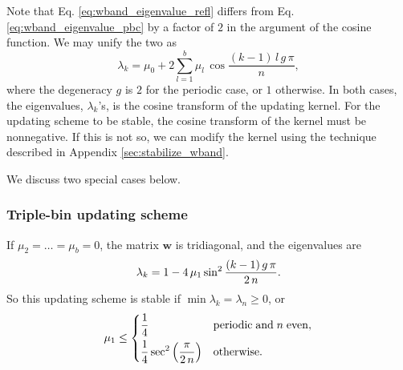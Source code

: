 \documentclass[reprint, floatfix]{revtex4-1}
\begin{document}
Note that Eq. \eqref{eq:wband_eigenvalue_refl}
differs from Eq. \eqref{eq:wband_eigenvalue_pbc}
by a factor of $2$
in the argument of the cosine function.
%
We may unify the two as
%
\begin{equation}
  \lambda_k
  =
  \mu_0
  +
  2
  \sum_{ l = 1 }^b
    \mu_l \,
    \cos \frac{ (k - 1) \, l \, g \, \pi }
              {            n             }
  ,
  \label{eq:wband_eigenvalue}
\end{equation}
%
where the degeneracy $g$ is $2$
for the periodic case,
or $1$ otherwise.
%
In both cases,
the eigenvalues, $\lambda_k$'s,
is the cosine transform of
the updating kernel.
%
For the updating scheme to be stable,
the cosine transform of the kernel
must be nonnegative.
%
If this is not so,
we can modify the kernel
using the technique described
in Appendix \ref{sec:stabilize_wband}.

We discuss two special cases below.



\subsubsection{\label{sec:nnscheme}
Triple-bin updating scheme}



If $\mu_2 = \dots = \mu_b = 0$,
the matrix $\mathbf w$ is tridiagonal,
and the eigenvalues are
\begin{equation}
  \lambda_k
  =
  1 -
  4 \, \mu_1 \sin^2
  \frac{ (k - 1) \, g \, \pi }
       {       2 \, n        }
  .
\notag
\end{equation}
%
So this updating scheme is stable if
$\min \lambda_k = \lambda_n \ge 0$,
or
\begin{equation}
  \mu_1 \le
  \begin{dcases}
    \frac 1 4
    & \mathrm{periodic \; and \;} n \mathrm{ \; even,}
    \\
    \frac 1 4
    \sec^2
    \left( \frac{  \pi   }
                { 2 \, n }
    \right)
    & \mathrm{otherwise}.
  \end{dcases}
\notag
\end{equation}
\end{document}
